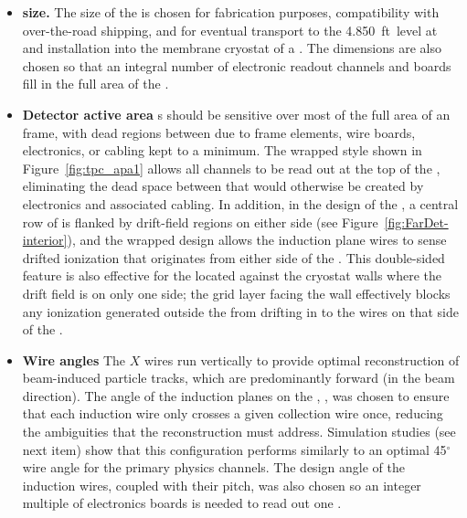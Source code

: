


\begin{itemize}
\item \textbf{ size.} The size of the  is chosen for fabrication purposes, compatibility with over-the-road shipping, and for eventual transport to the \SI{4,850}{ft}~level at  and installation into the membrane cryostat of a . The dimensions are also chosen so that an integral number of electronic readout channels and boards fill in the full area of the .


\item \textbf{Detector active area} s should be sensitive over most of the full area of an  frame, with dead regions between  due to frame elements, wire boards, electronics, or cabling kept to a minimum.  The wrapped style shown in Figure~\ref{fig:tpc_apa1} allows all channels to be read out at the top of the , eliminating the dead space between  that would otherwise be created by electronics and associated cabling. In addition, in the design of the , a central row of  is flanked by drift-field regions on either side (see Figure~\ref{fig:FarDet-interior}), and the wrapped design allows the induction plane wires to sense drifted ionization that originates from either side of the .  This double-sided feature is also effective for the  located against the cryostat walls where the drift field is on only one side; the grid layer facing the wall effectively blocks any ionization generated outside the  from drifting in to the wires on that side of the .        

\item \textbf{Wire angles} The $X$ wires run vertically to provide optimal reconstruction of beam-induced particle tracks, which are predominantly forward (in the beam direction). The angle of the induction planes on the , \apainducwireangle, was chosen to ensure that each induction wire only crosses a given collection wire once, reducing the ambiguities that the reconstruction must address.  Simulation studies (see next item) show that this configuration performs similarly to an optimal 45$^\circ$ wire angle for the primary  physics channels.  The design angle of the induction wires, coupled with their pitch, was also chosen so an integer multiple of electronics boards is needed to read out one .


\end{itemize}

